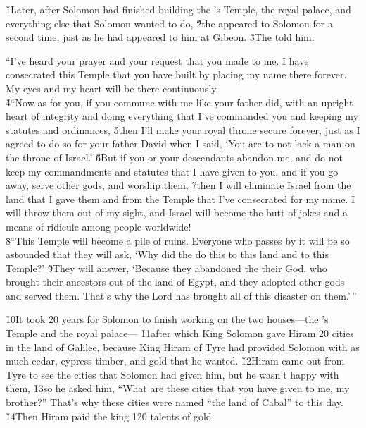 \v{1}Later, after Solomon had finished building the 's Temple, the royal palace, and everything else that Solomon wanted to do, \v{2}the  appeared to Solomon for a second time, just as he had appeared to him at Gibeon. \v{3}The  told him:

\begin{poetry}
\poeml ``I've heard your prayer and your request that you made to me. I have consecrated this Temple that you have built by placing my name there forever. My eyes and my heart will be there continuously. \\
\poeml \v{4}``Now as for you, if you commune with me like your father did, with an upright heart of integrity and doing everything that I've commanded you and keeping my statutes and ordinances, \v{5}then I'll make your royal throne secure forever, just as I agreed to do so for your father David when I said, `You are to not lack a man on the throne of Israel.' \v{6}But if you or your descendants abandon me, and do not keep my commandments and statutes that I have given to you, and if you go away, serve other gods, and worship them, \v{7}then I will eliminate Israel from the land that I gave them and from the Temple that I've consecrated for my name. I will throw them out of my sight, and Israel will become the butt of jokes and a means of ridicule among people worldwide! \\
\poeml \v{8}``This Temple will become a pile of ruins. Everyone who passes by it will be so astounded that they will ask, `Why did the  do this to this land and to this Temple?' \v{9}They will answer, `Because they abandoned the  their God, who brought their ancestors out of the land of Egypt, and they adopted other gods and served them. That's why the Lord has brought all of this disaster on them.'\,''
\end{poetry}

\v{10}It took 20 years for Solomon to finish working on the two houses---the 's Temple and the royal palace--- \v{11}after which King Solomon gave Hiram 20 cities in the land of Galilee, because King Hiram of Tyre had provided Solomon with as much cedar, cypress timber, and gold that he wanted. \v{12}Hiram came out from Tyre to see the cities that Solomon had given him, but he wasn't happy with them, \v{13}so he asked him, ``What are these cities that you have given to me, my brother?'' That's why these cities were named ``the land of Cabal'' to this day. \v{14}Then Hiram paid the king 120 talents of gold.

